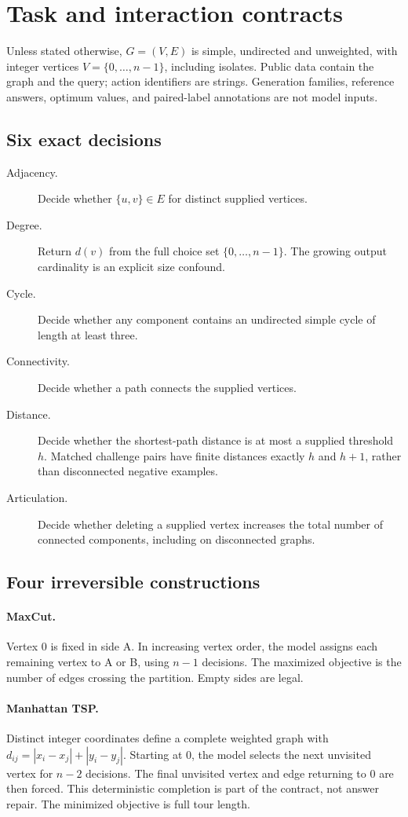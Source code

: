 \section{Task and interaction contracts}
\label{app:task-details}
Unless stated otherwise, $G=(V,E)$ is simple, undirected and unweighted, with
integer vertices $V=\{0,\ldots,n-1\}$, including isolates. Public data contain
the graph and the query; action identifiers are strings. Generation families,
reference answers, optimum values, and paired-label annotations are not model
inputs.

\subsection{Six exact decisions}
\begin{description}
 \item[Adjacency.] Decide whether $\{u,v\}\in E$ for distinct supplied vertices.
 \item[Degree.] Return $d(v)$ from the full choice set $\{0,\ldots,n-1\}$.
 The growing output cardinality is an explicit size confound.
 \item[Cycle.] Decide whether any component contains an undirected simple
 cycle of length at least three.
 \item[Connectivity.] Decide whether a path connects the supplied vertices.
 \item[Distance.] Decide whether the shortest-path distance is at most a
 supplied threshold $h$. Matched challenge pairs have finite distances
 exactly $h$ and $h+1$, rather than disconnected negative examples.
 \item[Articulation.] Decide whether deleting a supplied vertex increases
 the total number of connected components, including on disconnected graphs.
\end{description}

\subsection{Four irreversible constructions}
\paragraph{MaxCut.}
Vertex 0 is fixed in side A. In increasing vertex order, the model assigns
each remaining vertex to A or B, using $n-1$ decisions. The maximized objective
is the number of edges crossing the partition. Empty sides are legal.

\paragraph{Manhattan TSP.}
Distinct integer coordinates define a complete weighted graph with
$d_{ij}=|x_i-x_j|+|y_i-y_j|$. Starting at 0, the model selects the next unvisited
vertex for $n-2$ decisions. The final unvisited vertex and edge returning to 0
are then forced. This deterministic completion is part of the contract,
not answer repair. The minimized objective is full tour length.

